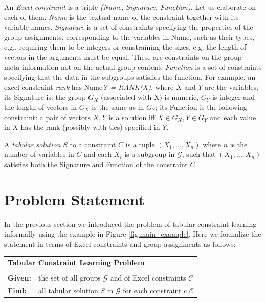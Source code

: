 \documentclass{ecai}
\newcommand{\constraints}{\ensuremath{\mathcal{C}}\xspace}
\newcommand{\CName}{Name\xspace}
\newcommand{\CSignature}{Signature\xspace}
\newcommand{\CFunction}{Function\xspace}
\newcommand{\groups}{\ensuremath{\mathcal{G}}\xspace}
\begin{document}
An \textit{Excel constraint} is a triple \textit{(\CName, \CSignature, \CFunction)}. Let us elaborate on each of them. \textit{\CName} is the textual name of the constraint together with its variable names. \textit{\CSignature} is a set of constraints specifying the properties of the group assignments, corresponding to the variables in \CName, such as their types, e.g., requiring them to be integers or constraining the sizes, e.g. the length of vectors in the arguments must be equal. These are constraints on the group meta-information not on the actual group content. \textit{\CFunction} is a set of constraints specifying that the data in the subgroups satisfies the function. For example, an excel constraint \textit{rank} has \CName \textit{Y = RANK(X)}, where $X$ and $Y$ are the variables; its \CSignature is: the group $G_X$ (associated with X) is numeric, $G_Y$ is integer and the length of vectors in $G_X$ is the same as in $G_Y$; its \CFunction is the following constraint: a pair of vectors $X,Y$ is a solution iff $X \in G_X, Y \in G_Y$ and each value in $X$ has the rank (possibly with ties) specified in $Y$.

A \textit{tabular solution} $S$ to a constraint $C$ is a tuple $(X_1, \dots, X_n)$ where $n$ is the number of variables in $C$ and each $X_i$ is a subgroup in \groups, such that $(X_1,\dots,X_n)$ satisfies both the \CSignature and \CFunction of the constraint $C$.

\section{Problem Statement}
In the previous section we introduced the problem of tabular constraint learning informally using the example in Figure \ref{fig:main_example}. Here we formalize the statement in terms of Excel constraints and group assignments as follows: 

\begin{minipage}[c]{14em}
  \vspace{5pt}
  \begin{tabular}{ll}
    \multicolumn{2}{l}{{\textbf{Tabular Constraint Learning Problem}}}\\
    \vspace{-4pt}
    &\\
    \textbf{Given:}& the set of all groups $\groups$ and of Excel constraints $\constraints$\\
    \textbf{Find:}&  all tabular solution $S$ in \groups for each constraint $c$ \constraints \\ 
  \end{tabular}
  \vspace{6pt}
\end{minipage}
\end{document}
